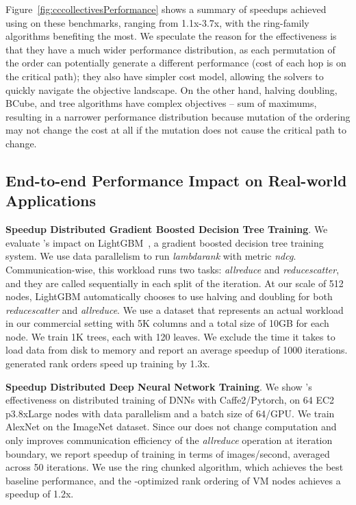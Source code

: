Figure~\ref{fig:cccollectivesPerformance} shows a summary of speedups achieved using \cmpi on these benchmarks, ranging from 1.1x-3.7x, with the ring-family algorithms benefiting the most. We speculate the reason for the effectiveness is that they have a much wider performance distribution, as each permutation of the order can potentially generate a different performance (cost of each hop is on the critical path); they also have simpler cost model, allowing the solvers to quickly navigate the objective landscape. On the other hand, halving doubling, BCube, and tree algorithms have complex objectives -- sum of maximums, resulting in a narrower performance distribution because mutation of the ordering may not change the cost at all if the mutation does not cause the critical path to change. %

\subsection{End-to-end Performance Impact on Real-world Applications}
\noindent \textbf{Speedup Distributed Gradient Boosted Decision Tree Training}. We evaluate \cmpi{}'s impact on LightGBM~\cite{Ke2017LightGBMAH}, a gradient boosted decision tree training system. We use data parallelism to run \textit{lambdarank} with metric \textit{ndcg}. Communication-wise, this workload runs two tasks: \textit{allreduce} and \textit{reducescatter}, and %
they are called sequentially in each split of the iteration. At our scale of 512 nodes, LightGBM automatically chooses to use halving and doubling for both \textit{reducescatter} and \textit{allreduce}. We use a dataset that represents an actual workload in our commercial setting with 5K columns and a total size of 10GB for each node. We train 1K trees, each with 120 leaves. We exclude the time it takes to load data from disk to memory and report an average speedup of 1000 iterations. \cmpi generated rank orders speed up training by 1.3x.

\noindent \textbf{Speedup Distributed Deep Neural Network Training}. We show \cmpi{}'s effectiveness on distributed training of DNNs with Caffe2/Pytorch, on 64 EC2 p3.8xLarge nodes with data parallelism and a batch size of 64/GPU. We train AlexNet on the ImageNet dataset. Since our \cmpi{} does not change computation and only improves communication efficiency of the \textit{allreduce} operation at iteration boundary, we report speedup of training in terms of images/second, averaged across 50 iterations. We use the ring chunked algorithm, which achieves the best baseline performance, and the \cmpi{}-optimized rank ordering of VM nodes achieves a speedup of 1.2x.